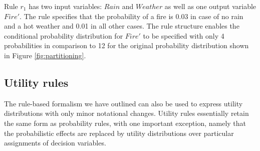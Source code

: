 Rule $r_1$ has two input variables: $\mathit{Rain}$ and $\mathit{Weather}$ as well as one output variable $\mathit{Fire}'$. The rule specifies that the probability of a fire is 0.03 in case of no rain and a hot weather and 0.01 in all other cases.  The rule structure enables the conditional probability distribution for $\mathit{Fire}'$ to be specified with only 4 probabilities in comparison to 12 for the original probability distribution shown in Figure \ref{fig:partitioning}. 


\subsection{Utility rules}

The rule-based formalism we have outlined can also be used to express utility distributions with only minor notational changes. Utility rules essentially retain the same form as probability rules, with one important exception, namely that the probabilistic effects are replaced by utility distributions over particular assignments of decision variables. 

